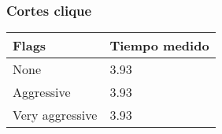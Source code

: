 \subsubsection{Cortes clique}

    \begin{center}
        \begin{tabular}{ | m{7em} | m{5cm} | }
        \hline
        Flags  & Tiempo medido \\
        \hline
        None  & 3.93 \\
        \hline
        Aggressive  & 3.93 \\
        \hline
        Very aggressive  & 3.93 \\
        \hline
        \end{tabular}
    \end{center}
